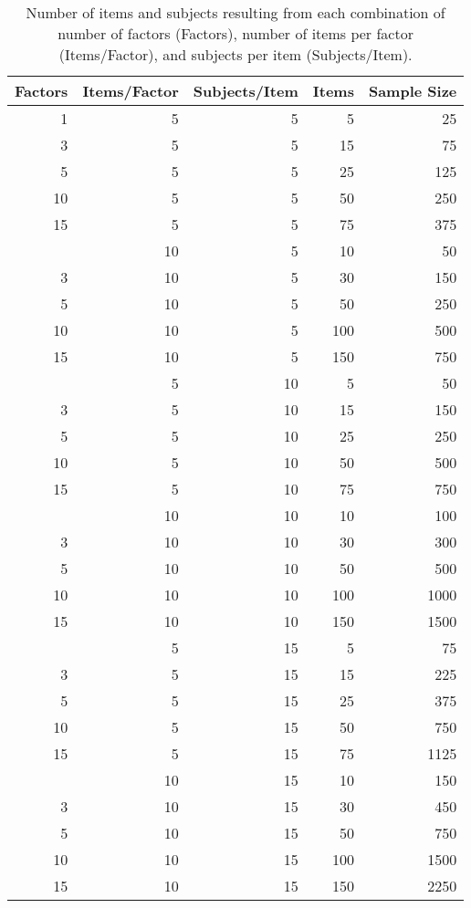 \documentclass[man]{apa6}
\begin{document}
\begin{longtable}[t]{rrrrr}
\caption{\label{tab:items-subjects-table}Number of items and subjects resulting from each combination of number of factors (Factors), number of items per factor (Items/Factor), and subjects per item (Subjects/Item).}\\
\toprule
Factors & Items/Factor & Subjects/Item & Items & Sample Size\\
\midrule
1 & 5 & 5 & 5 & 25\\
3 & 5 & 5 & 15 & 75\\
5 & 5 & 5 & 25 & 125\\
10 & 5 & 5 & 50 & 250\\
15 & 5 & 5 & 75 & 375\\
\addlinespace
1 & 10 & 5 & 10 & 50\\
3 & 10 & 5 & 30 & 150\\
5 & 10 & 5 & 50 & 250\\
10 & 10 & 5 & 100 & 500\\
15 & 10 & 5 & 150 & 750\\
\addlinespace
1 & 5 & 10 & 5 & 50\\
3 & 5 & 10 & 15 & 150\\
5 & 5 & 10 & 25 & 250\\
10 & 5 & 10 & 50 & 500\\
15 & 5 & 10 & 75 & 750\\
\addlinespace
1 & 10 & 10 & 10 & 100\\
3 & 10 & 10 & 30 & 300\\
5 & 10 & 10 & 50 & 500\\
10 & 10 & 10 & 100 & 1000\\
15 & 10 & 10 & 150 & 1500\\
\addlinespace
1 & 5 & 15 & 5 & 75\\
3 & 5 & 15 & 15 & 225\\
5 & 5 & 15 & 25 & 375\\
10 & 5 & 15 & 50 & 750\\
15 & 5 & 15 & 75 & 1125\\
\addlinespace
1 & 10 & 15 & 10 & 150\\
3 & 10 & 15 & 30 & 450\\
5 & 10 & 15 & 50 & 750\\
10 & 10 & 15 & 100 & 1500\\
15 & 10 & 15 & 150 & 2250\\
\bottomrule
\end{longtable}
\end{document}
